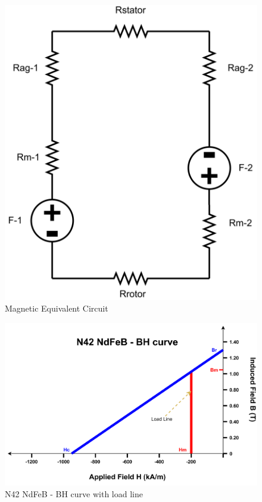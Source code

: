 \documentclass{article}
\begin{document}
\begin{figure}[h!]
\centering
\includegraphics[scale=0.5]{Figures/MagneticCircuit.png}
\caption{Magnetic Equivalent Circuit }
\label{fig:MagneticCircuit}
\end{figure}
\begin{figure}[h!]
\centering
\includegraphics[scale=0.8]{Figures/BHCurve.png}
\caption{N42 NdFeB - BH curve with load line}
\label{fig:BHCurve}
\end{figure}






\end{document}
